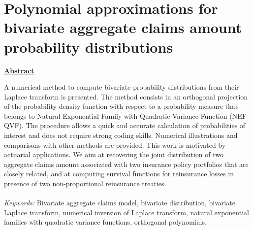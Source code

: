 
\chapter{Polynomial approximations for bivariate aggregate claims amount probability distributions}\label{Chapter5}
	\minitoc
	\newpage





\begin{center}
\Large{\underline{\textbf{Abstract}}}\\
\end{center}
A numerical method to compute bivariate probability distributions from their Laplace transform is presented. The method consists in an orthogonal projection of the probability density function with respect to a probability measure that belongs to Natural Exponential Family with Quadratic Variance Function (NEF-QVF). The procedure allows a quick and accurate calculation of probabilities of interest and does not require strong coding skills. Numerical illustrations and comparisons with other methods are provided. This work is motivated by actuarial applications. We aim at recovering the joint distribution of two aggregate claims amount associated with two insurance policy portfolios that are closely related, and at computing survival functions for reinsurance losses in presence of two non-proportional reinsurance treaties.\\
\\
\textit{Keywords:} Bivariate aggregate claims model, bivariate distribution, bivariate
 Laplace transform, numerical inversion of Laplace transform, natural exponential families with quadratic variance functions, orthogonal polynomials.
